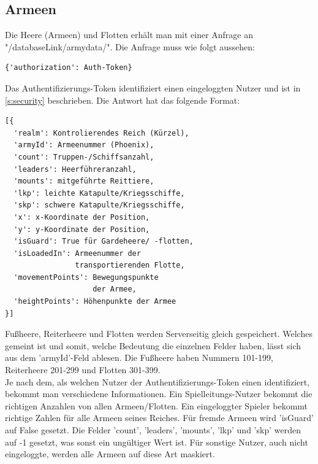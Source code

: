 \documentclass[11pt,a4paper,twocolumn]{article}
\begin{document}
\subsection{Armeen}\label{ss:read_armies}
Die Heere (Armeen) und Flotten erhält man mit einer Anfrage an "/databaseLink/armydata/". Die Anfrage muss wie folgt aussehen:
\begin{lstlisting}
{'authorization': Auth-Token}
\end{lstlisting}
Das Authentifizierungs-Token identifiziert einen eingeloggten Nutzer und ist in \ref{s:security} beschrieben. Die Antwort hat das folgende Format:
\begin{lstlisting}
[{
  'realm': Kontrolierendes Reich (Kürzel),
  'armyId': Armeenummer (Phoenix),
  'count': Truppen-/Schiffsanzahl,
  'leaders': Heerführeranzahl,
  'mounts': mitgeführte Reittiere,
  'lkp': leichte Katapulte/Kriegsschiffe,
  'skp': schwere Katapulte/Kriegsschiffe,
  'x': x-Koordinate der Position,
  'y': y-Koordinate der Position,
  'isGuard': True für Gardeheere/ -flotten,
  'isLoadedIn': Armeenummer der 
                transportierenden Flotte,
  'movementPoints': Bewegungspunkte 
					der Armee,
  'heightPoints': Höhenpunkte der Armee
}]
\end{lstlisting}
Fußheere, Reiterheere und Flotten werden Serverseitig gleich gespeichert. Welches gemeint ist und somit, welche Bedeutung die einzelnen Felder haben, lässt sich aus dem 'armyId'-Feld ablesen. Die Fußheere haben Nummern 101-199, Reiterheere 201-299 und Flotten 301-399.\\
Je nach dem, als welchen Nutzer der Authentifizierungs-Token einen identifiziert, bekommt man verschiedene Informationen. Ein Spielleitungs-Nutzer bekommt die richtigen Anzahlen von allen Armeen/Flotten. Ein eingeloggter Spieler bekommt richtige Zahlen für alle Armeen seines Reiches. Für fremde Armeen wird 'isGuard' auf False gesetzt. Die Felder 'count', 'leaders', 'mounts', 'lkp' und 'skp' werden auf -1 gesetzt, was sonst ein ungültiger Wert ist. Für sonstige Nutzer, auch nicht eingeloggte, werden alle Armeen auf diese Art maskiert.
\end{document}
